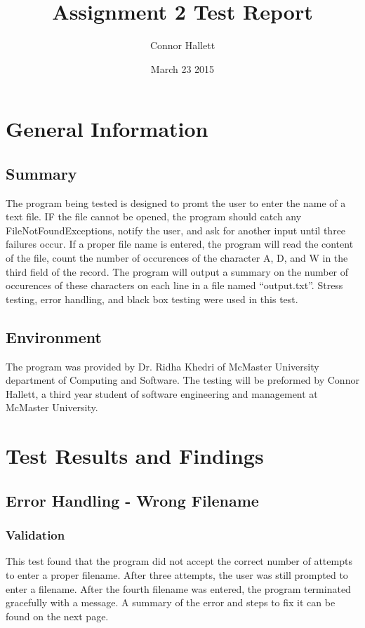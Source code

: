 \documentclass[]{article}
\title{Assignment 2 Test Report}
\author{Connor Hallett}
\date{March 23 2015}
\begin{document}
\maketitle	

\section{General Information}
\label{sec:introduction}

	\subsection{Summary}
	The program being tested is designed to promt the user to enter the name of a
text file.  IF the file cannot be opened, the program should catch any
FileNotFoundExceptions, notify the user, and ask for another input until three
failures occur.  If a proper file name is entered, the program will read the
content of the file, count the number of occurences of the character A, D, and W
in the third field of the record.  The program will output a summary on the
number of occurences of these characters on each line in a file named
``output.txt''. Stress testing, error handling, and black box testing were used
in this test.

	\subsection{Environment}
	The program was
provided by Dr. Ridha Khedri of McMaster University department of Computing and
Software.  The testing will be preformed by Connor Hallett, a third year student
of software engineering and management at McMaster University.

\section{Test Results and Findings}

\subsection{Error Handling - Wrong Filename}
	\subsubsection{Validation}
	This test found that the program did not accept the correct number of attempts
	to enter a proper filename.  After three attempts, the user was still prompted
	to enter a filename.  After the fourth filename was entered, the program
	terminated gracefully with a message.  A summary of the error and steps to fix
	it can be found on the next page.
	
\end{document}
